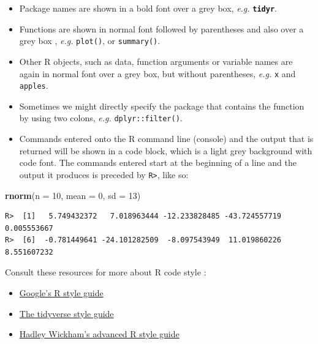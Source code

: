 \documentclass[
]{book}
\newenvironment{Shaded}{\begin{snugshade}}{\end{snugshade}}
\newcommand{\DataTypeTok}[1]{\textcolor[rgb]{0.13,0.29,0.53}{#1}}
\newcommand{\DecValTok}[1]{\textcolor[rgb]{0.00,0.00,0.81}{#1}}
\newcommand{\KeywordTok}[1]{\textcolor[rgb]{0.13,0.29,0.53}{\textbf{#1}}}
\newcommand{\NormalTok}[1]{#1}
\providecommand{\tightlist}{%
  \setlength{\itemsep}{0pt}\setlength{\parskip}{0pt}}
\begin{document}
\begin{itemize}
\tightlist
\item
  Package names are shown in a bold font over a grey box, \emph{e.g.} \textbf{\texttt{tidyr}}.
\item
  Functions are shown in normal font followed by parentheses and also over a grey box , \emph{e.g.} \texttt{plot()}, or \texttt{summary()}.
\item
  Other R objects, such as data, function arguments or variable names are again in normal font over a grey box, but without parentheses, \emph{e.g.} \texttt{x} and \texttt{apples}.
\item
  Sometimes we might directly specify the package that contains the function by using two colons, \emph{e.g.} \texttt{dplyr::filter()}.
\item
  Commands entered onto the R command line (console) and the output that is returned will be shown in a code block, which is a light grey background with code font. The commands entered start at the beginning of a line and the output it produces is preceded by \texttt{R\textgreater{}}, like so:
\end{itemize}

\begin{Shaded}
\begin{Highlighting}[]
\KeywordTok{rnorm}\NormalTok{(}\DataTypeTok{n =} \DecValTok{10}\NormalTok{, }\DataTypeTok{mean =} \DecValTok{0}\NormalTok{, }\DataTypeTok{sd =} \DecValTok{13}\NormalTok{)}
\end{Highlighting}
\end{Shaded}

\begin{verbatim}
R>  [1]   5.749432372   7.018963444 -12.233828485 -43.724557719   0.005553667
R>  [6]  -0.781449641 -24.101282509  -8.097543949  11.019860226   8.551607232
\end{verbatim}

Consult these resources for more about R code style :

\begin{itemize}
\tightlist
\item
  \href{https://google.github.io/styleguide/Rguide.xml}{Google's R style guide}
\item
  \href{http://style.tidyverse.org}{The tidyverse style guide}
\item
  \href{http://adv-r.had.co.nz/Style.html}{Hadley Wickham's advanced R style guide}
\end{itemize}
\end{document}
